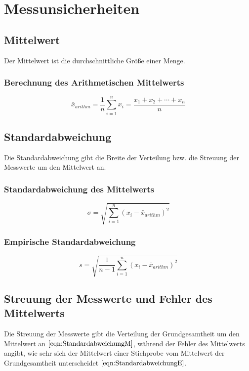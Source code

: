 \section{Messunsicherheiten}
\label{sec:Theorie}
    \subsection{Mittelwert}
    Der Mittelwert ist die durchschnittliche Größe einer Menge.
    \subsubsection{Berechnung des Arithmetischen Mittelwerts}
    \begin{equation}
        \bar{x}_{arithm} = \frac{1}{n}  \sum_{i=1}^n x_i = \frac{x_1 + x_2 + \cdots + x_n}{n}
        \label{eqn:arithmetischesmittel}
    \end{equation}

    \subsection{Standardabweichung}
    Die Standardabweichung gibt die Breite der Verteilung bzw. die Streuung der Messwerte um den Mittelwert an.
    \subsubsection{Standardabweichung des Mittelwerts}
    \begin{equation}
        \sigma = \sqrt{\sum_{i=1}^n (x_i - \bar{x}_{arithm})^2}
        \label{eqn:StandardabweichungM}
    \end{equation}
    \subsubsection{Empirische Standardabweichung}
    \begin{equation}
        s = \sqrt{\frac{1}{n - 1} \sum_{i=1}^n (x_i - \bar{x}_{arithm})^2}
        \label{eqn:StandardabweichungE}
    \end{equation}
    \subsection{Streuung der Messwerte und Fehler des Mittelwerts}
    Die Streuung der Messwerte gibt die Verteilung der Grundgesamtheit um den Mittelwert an $\eqref{eqn:StandardabweichungM}$, während der Fehler des Mittelwerts angibt, wie sehr sich der Mittelwert einer Stichprobe vom Mittelwert der Grundgesamtheit unterscheidet $\eqref{eqn:StandardabweichungE}$.
    




